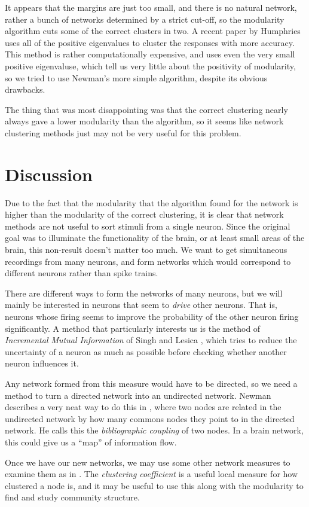 It appears that the margins are just too small, and there is no natural 
network, rather a bunch of networks determined by a strict cut-off, so the 
modularity algorithm cuts some of the correct clusters in two.  A recent paper 
by Humphries \cite{Humphries2011a} uses all of the positive eigenvalues to 
cluster the responses with more accuracy. This method is 
rather computationally expensive, and uses even the very small positive 
eigenvaluse, which tell us very little about the positivity of modularity, so 
we tried to use Newman's more simple algorithm, despite its obvious drawbacks.

The thing that was most disappointing was that the correct clustering nearly 
always gave a lower modularity than the algorithm, so it seems like network 
clustering methods just may not be very useful for this problem.


\section{Discussion}
Due to the fact that the modularity that the algorithm found for the network is 
higher than the modularity of the correct clustering, it is clear that network 
methods are not useful to sort stimuli from a single neuron.  Since the 
original goal was to illuminate the functionality of the brain, or at least 
small areas of the brain, this non-result doesn't matter too much.  We want to 
get simultaneous recordings from many neurons, and form networks which would 
correspond to different neurons rather than spike trains.

There are different ways to form the networks of many neurons, but we will 
mainly be interested in neurons that seem to {\sl drive} other neurons.  That 
is, neurons whose firing seems to improve the probability of the other neuron 
firing significantly.  A method that particularly interests us is the method of 
{\sl Incremental Mutual Information} of Singh and Lesica 
\cite{SinghLesica2010a}, which tries to reduce the uncertainty of a neuron as 
much as possible before checking whether another neuron influences it.

Any network formed from this measure would have to be directed, so we need a 
method to turn a directed network into an undirected network.  Newman describes 
a very neat way to do this in \cite{Newman2010a}, where two nodes are related 
in the undirected network by how many commons nodes they point to in the 
directed network.  He calls this the {\sl bibliographic coupling} of two 
nodes.  In a brain network, this could give us a ``map'' of information flow.

Once we have our new networks, we may use some other network measures to 
examine them as in \cite{RubinovSporns2010a}.  The {\sl clustering coefficient} 
is a useful local measure for how clustered a node is, and it may be useful to 
use this along with the modularity to find and study community structure.

